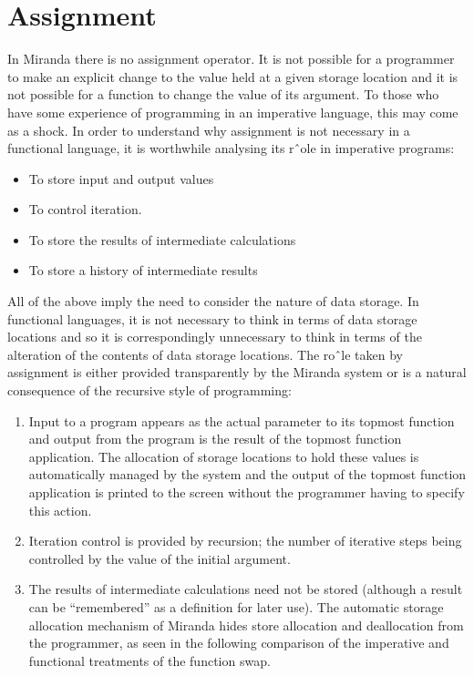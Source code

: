 \documentclass[11pt]{article}
\begin{document}
\section{Assignment}
In Miranda there is no assignment operator. It is not possible for a programmer
to make an explicit change to the value held at a given storage location and it is
not possible for a function to change the value of its argument. To those who have
some experience of programming in an imperative language, this may come as a
shock.
In order to understand why assignment is not necessary in a functional language,
it is worthwhile analysing its rˆole in imperative programs:
\begin{itemize}
    \item  To store input and output values
    \item  To control iteration.
    \item To store the results of intermediate calculations
    \item To store a history of intermediate results
\end{itemize}
\par
All of the above imply the need to consider the nature of data storage. In functional
languages, it is not necessary to think in terms of data storage locations and
so it is correspondingly unnecessary to think in terms of the alteration of the
contents of data storage locations. The roˆle taken by assignment is either provided
transparently by the Miranda system or is a natural consequence of the recursive
style of programming:
\begin{enumerate}
    \item Input to a program appears as the actual parameter to its topmost function
and output from the program is the result of the topmost function application. The allocation of storage locations to hold these values is automatically
managed by the system and the output of the topmost function application is
printed to the screen without the programmer having to specify this action.
\item Iteration control is provided by recursion; the number of iterative steps being
controlled by the value of the initial argument.
\item The results of intermediate calculations need not be stored (although a result
can be “remembered” as a definition for later use). The automatic storage
allocation mechanism of Miranda hides store allocation and deallocation from
the programmer, as seen in the following comparison of the imperative and
functional treatments of the function swap.
\end{enumerate}
\end{document}
